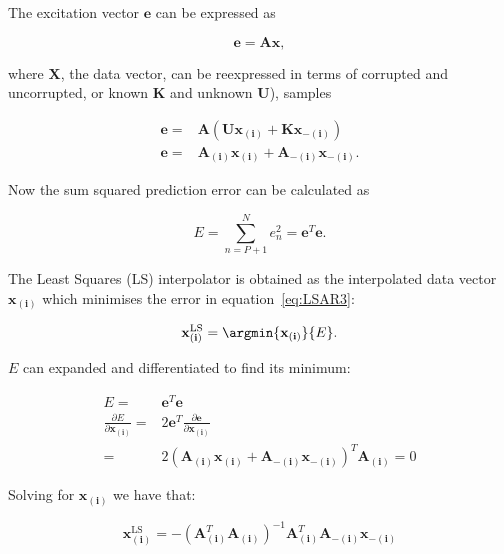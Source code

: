 The excitation vector $\mathbf{e}$ can be expressed as

\begin{equation}\label{eq:LSAR1}
  \mathbf{e} = \mathbf{A}\mathbf{x},
\end{equation}

where $\mathbf{X}$, the data vector, can be reexpressed in terms of corrupted and uncorrupted, or known $\mathbf{K}$ and unknown $\mathbf{U}$), samples

\begin{align}\label{eq:LSAR2}
  \mathbf{e} = & \mathbf{A} (\mathbf{U}\mathbf{x}_{\mathbf{(i)}} + \mathbf{K}\mathbf{x}_{\mathbf{-(i)}}) \\
  \mathbf{e} = & \mathbf{A}_{\mathbf{(i)}} \mathbf{x}_{\mathbf{(i)}} + \mathbf{A}_{\mathbf{-(i)}}\mathbf{x}_{\mathbf{-(i)}}.
\end{align}

Now the sum squared prediction error can be calculated as

\begin{equation}\label{eq:LSAR3}
  E = \sum^N_{n=P+1} e^2_n = \mathbf{e}^T\mathbf{e}.
\end{equation}

The Least Squares (LS) interpolator is obtained as the interpolated data vector $\mathbf{x}_{\mathbf{(i)}}$ which minimises the error in equation~\ref{eq:LSAR3}:

\begin{equation}\label{eq:LSAR4}
  \mathbf{x}^{\mathrm{LS}}_{\mathbf{(i)}} = \argmin{\mathbf{x}_{\mathbf{(i)}}} \{ E \}.
\end{equation}

$E$ can expanded and differentiated to find its minimum:

\begin{align}\label{eq:LSAR5}
  E = & \mathbf{e}^T\mathbf{e} \\
  \frac{\partial E}{\partial \mathbf{x}_{\mathbf{(i)}}} = & 2\mathbf{e}^T \frac{\partial \mathbf{e}}{\partial \mathbf{x}_{\mathbf{(i)}}} \\
   = & 2 (\mathbf{A}_{\mathbf{(i)}} \mathbf{x}_{\mathbf{(i)}} + \mathbf{A}_{\mathbf{-(i)}}\mathbf{x}_{\mathbf{-(i)}})^T \mathbf{A}_{\mathbf{(i)}} = 0
\end{align}

Solving for $\mathbf{x}_{\mathbf{(i)}}$ we have that:

\begin{equation}\label{eq:LSAR6}
  \mathbf{x}^{\mathrm{LS}}_{\mathbf{(i)}} = - (\mathbf{A}_{\mathbf{(i)}}^T \mathbf{A}_{\mathbf{(i)}} )^{-1}\mathbf{A}_{\mathbf{(i)}}^T\mathbf{A}_{\mathbf{-(i)}}\mathbf{x}_{\mathbf{-(i)}}
\end{equation}

